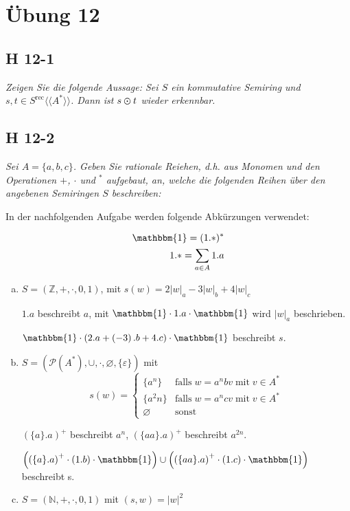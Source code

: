 \documentclass{scrartcl}
\begin{document}
\section{Übung 12}

\subsection{H 12-1}

\textsl{Zeigen Sie die folgende Aussage: Sei $S$ ein kommutative Semiring und $s, t \in S^{\text{rec}}\langle\langle A^* \rangle\rangle$. Dann ist $s \varodot t$ wieder erkennbar.}

\subsection{H 12-2}

\textsl{Sei $A = \{a, b, c\}$. Geben Sie rationale Reiehen, d.h. aus Monomen und den Operationen $+$, $\cdot$ und ${}^*$ aufgebaut, an, welche die folgenden Reihen über den angebenen Semiringen $S$ beschreiben:}

In der nachfolgenden Aufgabe werden folgende Abkürzungen verwendet:

\begin{align*}
  \mathbbm{1} = (1.*)^*\\
  1.* = \sum\limits_{a \in A} 1.a\\
\end{align*}

\begin{enumerate}[(a)]
    \item $S = (\mathbb{Z}, +, \cdot, 0, 1)$, mit $s(w) = 2|w|_a -3|w|_b + 4|w|_c$

      $1.a$ beschreibt $a$, mit $\mathbbm{1} \cdot 1.a \cdot \mathbbm{1}$ wird $|w|_a$ beschrieben.

      $\mathbbm{1} \cdot \left(2.a + \left(-3\right).b + 4.c\right) \cdot \mathbbm{1}$ beschreibt $s$.

    \item $S = (\mathcal{P}(A^*), \cup, \cdot, \varnothing, \{\varepsilon\})$ mit
      \begin{equation*}
        s(w) = \begin{cases}
          \{a^n\}     &\text{falls}\;w = a^nbv\;\text{mit}\;v \in A^*\\
          \{a^2n\}    &\text{falls}\;w=a^ncv\;\text{mit}\;v \in A^*\\
          \varnothing &\text{sonst}
        \end{cases}
      \end{equation*}

      $(\{a\}.a)^+$ beschreibt $a^n$, $(\{aa\}.a)^+$ beschreibt $a^{2n}$.

      $\left(\left(\{a\}.a\right)^+ \cdot \left(1.b\right) \cdot \mathbbm{1}\right) \cup \left(\left(\{aa\}.a\right)^+ \cdot \left(1.c\right) \cdot \mathbbm{1}\right)$ beschreibt s.

    \item $S = (\mathbb{N}, +, \cdot, 0, 1)$ mit $(s, w) = |w|^2$
\end{enumerate}
\end{document}
